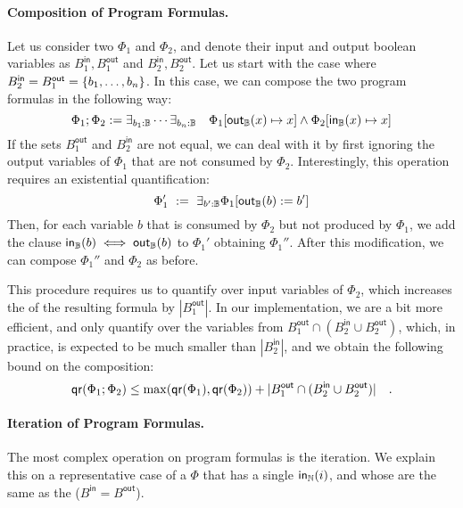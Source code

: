 \paragraph{Composition of Program Formulas.}
Let us consider two  $\Phi_1$ and $\Phi_2$,
and denote their input and output boolean variables as 
$B_1^{\mathsf{in}}, B_1^{\mathsf{out}}$ and $B_2^{\mathsf{in}}, B_2^{\mathsf{out}}$.
Let us start with the case where $B_2^{\mathsf{in}} = B_1^{\mathsf{out}} = \{ b_1, \dots, b_n \}$.
In this case, we can compose the two program formulas in the following way:
\begin{equation*}
    \Phi_1 ; \Phi_2 :=
    \exists_{b_1 : \mathbb{B}} \cdots \exists_{b_n : \mathbb{B}}
    \quad
    \Phi_1[ \mathsf{out}_{\mathbb{B}}(x) \mapsto x ]
    \wedge 
    \Phi_2[ \mathsf{in}_{\mathbb{B}}(x) \mapsto x ]
\end{equation*}
If the sets $B_1^{\mathsf{out}}$ and $B_2^{\mathsf{in}}$ are not equal,
we can deal with it by first ignoring the output variables of $\Phi_1$
that are not consumed by $\Phi_2$. Interestingly, this operation 
requires an existential quantification:
\[\Phi_1' \ := \ \exists_{b' : \mathbb{B}} \Phi_1[\mathsf{out}_{\mathbb{B}}(b) := b'] \] 
Then, for each variable $b$ that is consumed by $\Phi_2$ but not produced by $\Phi_1$,
we add the clause $\mathsf{in}_{\mathbb{B}}(b) \iff \mathsf{out}_{\mathbb{B}}(b)$ to $\Phi_1'$ obtaining $\Phi_1''$.
After this modification, we can compose $\Phi_1''$ and $\Phi_2$ as before.

This procedure requires us to quantify over input variables of $\Phi_2$, which 
increases the  of the resulting formula by
$|B_1^{\mathsf{out}}|$. In our implementation, we are a bit more efficient, 
and only quantify over the variables from $B_1^{\mathsf{out}}
\cap (B_2^{\mathsf{in}} \cup B_2^{\mathsf{out}})$, which, in practice, is expected
to be much smaller than $|B_2^{\mathsf{in}}|$, and we obtain the following bound
on the composition: 
\begin{equation*}
    \mathop{\mathsf{qr}}(\Phi_1 ; \Phi_2) 
    \leq \max(\mathop{\mathsf{qr}}(\Phi_1), \mathop{\mathsf{qr}}(\Phi_2)) 
    +    |B_1^{\mathsf{out}} \cap (B_2^{\mathsf{in}} \cup B_2^{\mathsf{out}})|
    \quad .
\end{equation*}

\paragraph{Iteration of Program Formulas.} The most complex operation on 
program formulas is the iteration. We explain this on a representative 
case of a  $\Phi$ that has a single  $\mathsf{in}_{\mathbb{N}}(i)$,
and whose  are the same as the 
($B^{\mathsf{in}} = B^{\mathsf{out}}$).

